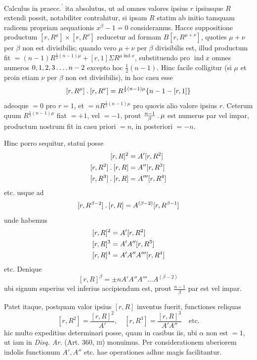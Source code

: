 %
Calculus in praecc.\textsuperscript{'} ita absolutus, ut ad omnes valores ipsius $r$ ipsiusque $R$ extendi possit, notabiliter contrahitur, si ipsam $R$ statim ab initio tamquam radicem propriam aequationis $x^\beta-1=0$ consideramus. Hacce suppositione productum $[r,R^\mu]\times[r,R^\nu]$ reducetur ad formam $B[r,R^{\mu+\nu}]$, quoties $\mu+\nu$ per $\beta$ non est divisibilis; quando vero $\mu+\nu$ per $\beta$ divisibilis est, illud productum fit $=(n-1)R^{\frac12(n-1)\mu}+[r,1]\Sigma R^{\mu\operatorname{ind}x}$, substituendo pro $\operatorname{ind}x$ omnes numeros $0,1,2,3\mathinner{.\,.\,.\,.} n-2$ excepto hoc $\frac12(n-1)$. Hinc facile colligitur (si $\mu$ et proin etiam $\nu$ per $\beta$ non est divisibilis), in hoc casu esse
\[
[r,R^\mu]\mathbin{.}[r,R^\nu]=R^{\frac12(n-1)\mu}\{n-1-[r,1]\}
\]
adeoque $=0$ pro $r=1$, et $=nR^{\frac12(n-1)\mu}$ pro quovis alio valore ipsius $r$. Ceterum quum $R^{\frac12(n-1)\mu}$ fiat $=+1$, vel $=-1$, prout $\frac{n-1}\beta\mathbin{.}\mu$ est numerus par vel impar, productum nostrum fit in casu priori $=n$, in posteriori $=-n$.

Hinc porro sequitur, statui posse
\[
\begin{aligned}
[r,R]^2&=A'[r,R^2]\\
\relax[r,R^2]\pdot[r,R]&=A''[r,R^3]\\
\relax[r,R^3]\pdot[r,R]&=A'''[r,R^4]
\end{aligned}
\]
etc. usque ad
\[
[r,R^{\beta-2}]\mathbin{.}[r,R]=A^{(\beta-2)}[r,R^{\beta-1}]
\]
unde habemus
\[
\begin{aligned}
[r,R]^2&=A'[r,R^2]\\
\relax[r,R]^3&=A'A''[r,R^3]\\
\relax[r,R]^4&=A'A''A'''[r,R^4]
\end{aligned}
\]
etc. Denique
\[
[r,R]^\beta=\pm nA'A''A'''\dots A^{(\beta-2)}
\]
ubi signum superius vel inferius accipiendum est, prout $\frac{n-1}\beta$ par est vel impar.

Patet itaque, postquam valor ipsius $[r,R]$ inventus fuerit, functiones reliquas
\[
[r,R^2]=\frac{[r,R]^2}{A'},\quad[r,R^3]=\frac{[r,R]^3}{A'A''}\quad\text{etc.}
\]
hic multo expeditius determinari posse, quam in casibus iis, ubi $\alpha$ non est $=1$,
%
ut iam in \emph{Disq. Ar.} (Art. 360, \textsc{iii}) monuimus. Per considerationem uberiorem indolis functionum $A',A''$ etc. hae operationes adhuc magis facilitantur.

